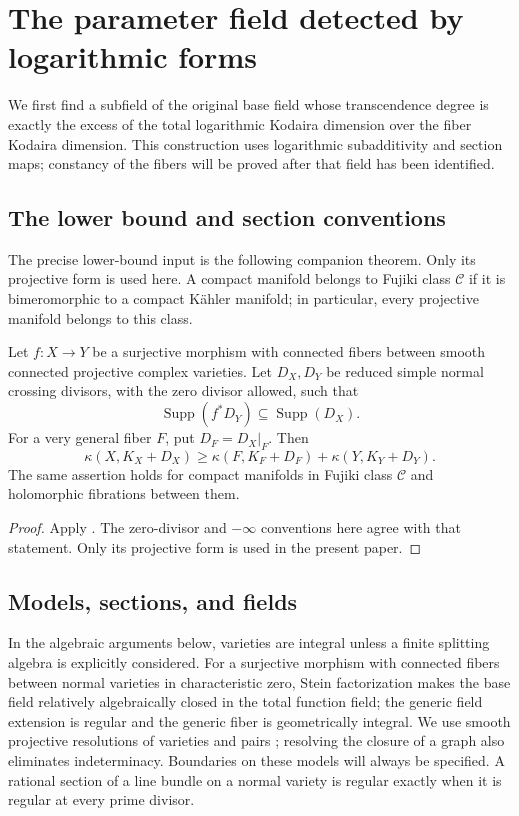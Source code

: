 \section{The parameter field detected by logarithmic forms}
\label{sec:inputs}\label{it:section}

We first find a subfield of the original base field whose transcendence
degree is exactly the excess of the total logarithmic Kodaira dimension
over the fiber Kodaira dimension. This construction uses logarithmic
subadditivity and section maps; constancy of the fibers will be proved
after that field has been identified.

\subsection{The lower bound and section conventions}

The precise lower-bound input is the following companion theorem.
Only its projective form is used here. A compact manifold belongs to
Fujiki class $\mathcal C$ if it is bimeromorphic to a compact K\"ahler
manifold; in particular, every projective manifold belongs to this class.

\begin{theorem}
\label{spec:logarithmic}
Let $f:X\to Y$ be a surjective morphism with connected fibers between
smooth connected projective complex varieties. Let $D_X,D_Y$ be
reduced simple normal crossing divisors, with the zero divisor allowed,
such that
\[
 \operatorname{Supp}(f^*D_Y)\subseteq\operatorname{Supp}(D_X).
\]
For a very general fiber $F$, put $D_F=D_X|_F$. Then
\[
 \kappa(X,K_X+D_X)
 \geq\kappa(F,K_F+D_F)+\kappa(Y,K_Y+D_Y).
\]
The same assertion holds for compact manifolds in Fujiki class
$\mathcal C$ and holomorphic fibrations between them.
\end{theorem}

\begin{proof}
Apply
\cite[\PoneLog]{SubadditivityCompanion}.
The zero-divisor and $-\infty$ conventions here agree with that statement.
Only its projective form is used in the present paper.
\end{proof}

\subsection{Models, sections, and fields}

In the algebraic arguments below, varieties are integral unless a
finite splitting algebra is explicitly considered. For a surjective morphism with connected fibers between normal
varieties in characteristic zero, Stein factorization makes the base
field relatively algebraically closed in the total function field; the
generic field extension is regular and the generic fiber is geometrically
integral.
We use smooth projective resolutions of varieties and pairs
\cite{BierstoneMilmanFunctorial}; resolving the closure of a graph
also eliminates indeterminacy. Boundaries on these models will always
be specified. A rational section of a line bundle on a normal variety
is regular exactly when it is regular at every prime divisor.


